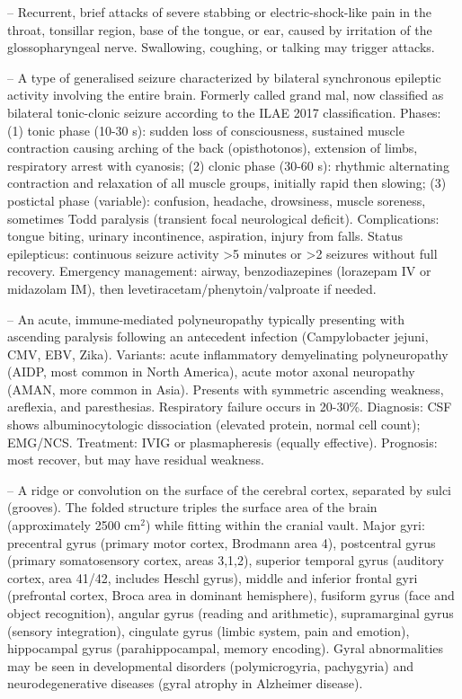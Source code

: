 -- Recurrent, brief attacks of severe stabbing or electric-shock-like pain in the throat, tonsillar region, base of the tongue, or ear, caused by irritation of the glossopharyngeal nerve. Swallowing, coughing, or talking may trigger attacks.

-- A type of generalised seizure characterized by bilateral synchronous epileptic activity involving the entire brain. Formerly called grand mal, now classified as bilateral tonic-clonic seizure according to the ILAE 2017 classification. Phases: (1) tonic phase (10-30 s): sudden loss of consciousness, sustained muscle contraction causing arching of the back (opisthotonos), extension of limbs, respiratory arrest with cyanosis; (2) clonic phase (30-60 s): rhythmic alternating contraction and relaxation of all muscle groups, initially rapid then slowing; (3) postictal phase (variable): confusion, headache, drowsiness, muscle soreness, sometimes Todd paralysis (transient focal neurological deficit). Complications: tongue biting, urinary incontinence, aspiration, injury from falls. Status epilepticus: continuous seizure activity >5 minutes or >2 seizures without full recovery. Emergency management: airway, benzodiazepines (lorazepam IV or midazolam IM), then levetiracetam/phenytoin/valproate if needed.

-- An acute, immune-mediated polyneuropathy typically presenting with ascending paralysis following an antecedent infection (Campylobacter jejuni, CMV, EBV, Zika). Variants: acute inflammatory demyelinating polyneuropathy (AIDP, most common in North America), acute motor axonal neuropathy (AMAN, more common in Asia). Presents with symmetric ascending weakness, areflexia, and paresthesias. Respiratory failure occurs in 20-30\%. Diagnosis: CSF shows albuminocytologic dissociation (elevated protein, normal cell count); EMG/NCS. Treatment: IVIG or plasmapheresis (equally effective). Prognosis: most recover, but may have residual weakness.

-- A ridge or convolution on the surface of the cerebral cortex, separated by sulci (grooves). The folded structure triples the surface area of the brain (approximately 2500 cm$^2$) while fitting within the cranial vault. Major gyri: precentral gyrus (primary motor cortex, Brodmann area 4), postcentral gyrus (primary somatosensory cortex, areas 3,1,2), superior temporal gyrus (auditory cortex, area 41/42, includes Heschl gyrus), middle and inferior frontal gyri (prefrontal cortex, Broca area in dominant hemisphere), fusiform gyrus (face and object recognition), angular gyrus (reading and arithmetic), supramarginal gyrus (sensory integration), cingulate gyrus (limbic system, pain and emotion), hippocampal gyrus (parahippocampal, memory encoding). Gyral abnormalities may be seen in developmental disorders (polymicrogyria, pachygyria) and neurodegenerative diseases (gyral atrophy in Alzheimer disease).

